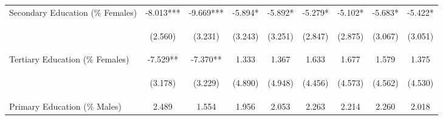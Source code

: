 \begin{landscape}
\begin{table}[htpb!]
\begin{center}
\begin{tabular}{lcccccccc}
Secondary Education (\% Females) &-8.013***&-9.669***&-5.894*&-5.892*&-5.279*&-5.102*&-5.683*&-5.422*\\
&\begin{footnotesize}(2.560)\end{footnotesize}&\begin{footnotesize}(3.231)\end{footnotesize}&\begin{footnotesize}(3.243)\end{footnotesize}&\begin{footnotesize}(3.251)\end{footnotesize}&\begin{footnotesize}(2.847)\end{footnotesize}&\begin{footnotesize}(2.875)\end{footnotesize}&\begin{footnotesize}(3.067)\end{footnotesize}&\begin{footnotesize}(3.051)\end{footnotesize}\\
Tertiary Education (\% Females) &-7.529**&-7.370**&1.333&1.367&1.633&1.677&1.579&1.375\\
&\begin{footnotesize}(3.178)\end{footnotesize}&\begin{footnotesize}(3.229)\end{footnotesize}&\begin{footnotesize}(4.890)\end{footnotesize}&\begin{footnotesize}(4.948)\end{footnotesize}&\begin{footnotesize}(4.456)\end{footnotesize}&\begin{footnotesize}(4.573)\end{footnotesize}&\begin{footnotesize}(4.562)\end{footnotesize}&\begin{footnotesize}(4.530)\end{footnotesize}\\
Primary Education (\% Males) &2.489&1.554&1.956&2.053&2.263&2.214&2.260&2.018\\

\end{tabular}
\end{center}
\end{table}
\end{landscape}
